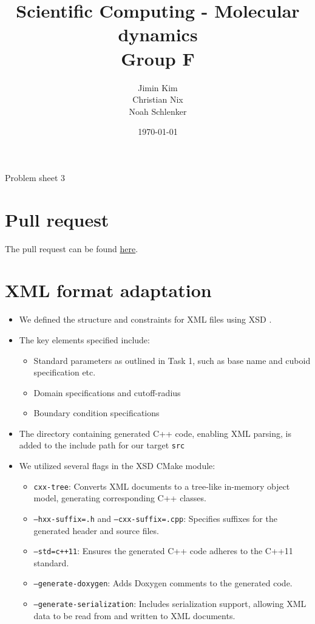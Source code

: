 \documentclass{article}
\title{Scientific Computing - Molecular dynamics \\ Group F}
\author{
    Jimin Kim \\
    Christian Nix \\
    Noah Schlenker
}
\date{\today}
\newcommand{\subtitle}{Problem sheet 3}
\begin{document}
\maketitle

\begin{center}
    \LARGE \subtitle{}
\end{center}

\section{Pull request}
\label{sec:pr}
The pull request can be found \href{https://github.com/noahpy/MolSim-SS24/pull/33}{here}.

\section{XML format adaptation}
\label{sec:xml}

\begin{itemize}
    \item We defined the structure and constraints for XML files using XSD .
    \item The key elements specified include:
    \begin{itemize}
        \item Standard parameters as outlined in Task 1, such as base name and cuboid specification etc.
        \item Domain specifications and cutoff-radius
        \item Boundary condition specifications
    \end{itemize}
    \item The directory containing generated C++ code, enabling XML parsing, is added to the include path for our target \texttt{src}
    \item We utilized several flags in the XSD CMake module:
    \begin{itemize}
        \item \texttt{cxx-tree}: Converts XML documents to a tree-like in-memory object model, generating corresponding C++ classes.
        \item \texttt{--hxx-suffix=.h} and \texttt{--cxx-suffix=.cpp}: Specifies suffixes for the generated header and source files.
        \item \texttt{--std=c++11}: Ensures the generated C++ code adheres to the C++11 standard.
        \item \texttt{--generate-doxygen}: Adds Doxygen comments to the generated code.
        \item \texttt{--generate-serialization}: Includes serialization support, allowing XML data to be read from and written to XML documents.
    \end{itemize}
\end{itemize}
\end{document}
